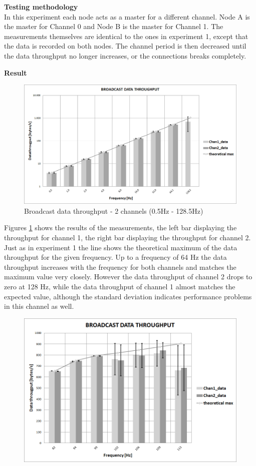 \begin{description}
	\item{\textbf{Testing methodology}} \hfill \\ In this experiment each node acts as a master for a different channel. Node A is the master for Channel 0 and Node B is the master for Channel 1. The measurements themselves are identical to the ones in experiment 1, except that the data is recorded on both nodes. The channel period is then decreased until the data throughput no longer increases, or the connections breaks completely.
	\newpage
	\item{\textbf{Result}} \hfill \\  	
	\begin{figure}[H]
		\centering
		\includegraphics[scale=0.5]{content/images/exp2_norm.png}
		\caption{Broadcast data throughput - 2 channels (0.5Hz - 128.5Hz)}\label{fig:exp2low}
	\end{figure}
	Figures \ref{fig:exp2low} shows the results of the measurements, the left bar displaying the throughput for channel 1, the right bar displaying the throughput for channel 2. Just as in experiment 1 the  line shows the theoretical maximum of the data throughput for the given frequency. Up to a frequency of 64 Hz the data throughput increases with the frequency for both channels and matches the maximum value very closely. However the data throughput of channel 2  drops to zero at 128 Hz, while the data throughput of channel 1 almost matches the expected value, although the standard deviation indicates performance problems in this channel as well.
		\begin{figure}[H]
			\centering
			\includegraphics[scale=0.5]{content/images/exp2_detail.png}

\end{figure}
\end{description}

